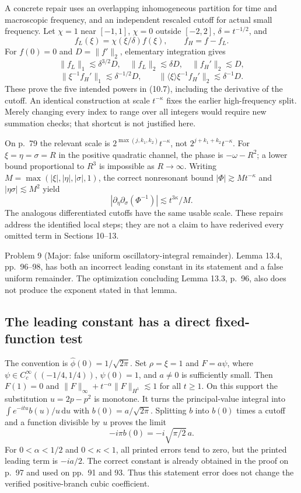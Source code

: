 \documentclass[10pt]{article}
\begin{document}
A concrete repair uses an overlapping inhomogeneous partition for time and macroscopic frequency, and an independent rescaled cutoff for actual small frequency. Let \(\chi=1\) near \([-1,1]\), \(\chi=0\) outside \([-2,2]\), \(\delta=t^{-1/2}\), and \[f_L(\xi)=\chi(\xi/\delta)f(\xi),\qquad f_H=f-f_L.\] For \(f(0)=0\) and \(D=\|f'\|_2\), elementary integration gives \[\|f_L\|_1\lesssim\delta^{3/2}D,\quad
 \|f_L\|_2\lesssim\delta D,\quad
 \|f_H'\|_2\lesssim D,\] \[\|\xi^{-1}f_H'\|_1\lesssim\delta^{-1/2}D,\qquad
 \|\langle \xi\rangle\xi^{-1}f_H'\|_2\lesssim\delta^{-1}D .\] These prove the five intended powers in (10.7), including the derivative of the cutoff. An identical construction at scale \(t^{-\kappa}\) fixes the earlier high-frequency split. Merely changing every index to range over all integers would require new summation checks; that shortcut is not justified here.\par
On p. 79 the relevant scale is \(2^{\max(j,k_1,k_2)}t^{-\kappa}\), not \(2^{j+k_1+k_2}t^{-\kappa}\). For \(\xi=\eta=\sigma=R\) in the positive quadratic channel, the phase is \(-\omega-R^2\); a lower bound proportional to \(R^3\) is impossible as \(R\to\infty\). Writing \(M=\max(|\xi|,|\eta|,|\sigma|,1)\), the correct nonresonant bound \(|\Phi|\gtrsim Mt^{-\kappa}\) and \(|\eta\sigma|\lesssim M^2\) yield \[|\partial_\eta\partial_\sigma(\Phi^{-1})|
 \lesssim t^{3\kappa}/M .\] The analogous differentiated cutoffs have the same usable scale. These repairs address the identified local steps; they are not a claim to have rederived every omitted term in Sections 10–13.\par
Problem 9 (Major: false uniform oscillatory-integral remainder).  Lemma 13.4, pp. 96–98, has both an incorrect leading constant in its statement and a false uniform remainder. The optimization concluding Lemma 13.3, p. 96, also does not produce the exponent stated in that lemma.\par
\subsection*{The leading constant has a direct fixed-function test}
The convention is \(\widehat\phi(0)=1/\sqrt{2\pi}\). Set \(\rho=\xi=1\) and \(F=a\psi\), where \(\psi\in C_c^\infty((-1/4,1/4))\), \(\psi(0)=1\), and \(a\ne0\) is sufficiently small. Then \(F(1)=0\) and \(\|F\|_\infty+t^{-\alpha}\|F\|_{H^1}\lesssim1\) for all \(t\ge1\). On this support the substitution \(u=2p-p^2\) is monotone. It turns the principal-value integral into \(\int e^{-itu}b(u)/u\,\mathrm du\) with \(b(0)=a/\sqrt{2\pi}\). Splitting \(b\) into \(b(0)\) times a cutoff and a function divisible by \(u\) proves the limit \[-i\pi b(0)=-i\sqrt{\pi/2}\,a .\] For \(0<\alpha<1/2\) and \(0<\kappa<1\), all printed errors tend to zero, but the printed leading term is \(-ia/2\). The correct constant is already obtained in the proof on p. 97 and used on pp. 91 and 93. Thus this statement error does not change the verified positive-branch cubic coefficient.\par
\end{document}
